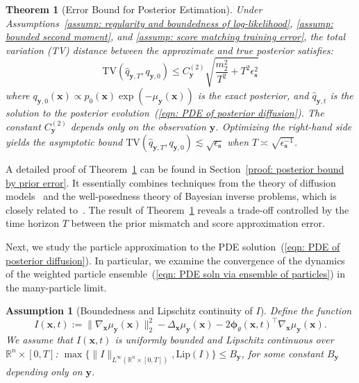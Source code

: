 \documentclass{article}
\numberwithin{equation}{section}
\newtheorem{theorem}{Theorem}[section]
\newtheorem{assumption}{Assumption}[section]
\def\eqref#1{(\ref{#1})}
\def\vs{{\bm{s}}}
\def\vx{{\bm{x}}}
\def\vy{{\bm{y}}}
\def\vphi{{\bm{\phi}}}
\newcommand{\TV}{\mathrm{TV}}
\begin{document}
\begin{tcolorbox}[colback=lightgray,boxrule=0pt,sharp corners]
\begin{theorem}[Error Bound for Posterior Estimation]
\label{thm: bound on true and approx posterior}
Under Assumptions~\ref{assump: regularity and boundedness of log-likelihood}, \ref{assump: bounded second moment}, and \ref{assump: score matching training error}, the total variation (TV) distance between the approximate and true posterior satisfies:
$$
    \TV(\widehat{q}_{\vy,T},q_{\vy,0}) \leq C^{(2)}_{\vy}\sqrt{\frac{m_2^2}{T^2} + T^2\epsilon_{\vs}^2}
$$
where $q_{\vy,0}(\vx) \propto p_0(\vx)\exp(-\mu_{\vy}(\vx))$ is the exact posterior, and $\widehat{q}_{\vy,t}$ is the solution to the posterior evolution~\eqref{eqn: PDE of posterior diffusion}. The constant $C^{(2)}_{\vy}$ depends only on the observation $\vy$. Optimizing the right-hand side yields the asymptotic bound $\TV(\widehat{q}_{\vy,T},q_{\vy,0}) \lesssim \sqrt{\epsilon_\vs}$ when $T \asymp \sqrt{\epsilon_\vs^{-1}}$.
\end{theorem}
\end{tcolorbox}

A detailed proof of Theorem~\ref{thm: bound on true and approx posterior} can be found in Section~\ref{proof: posterior bound by prior error}. It essentially combines techniques from the theory of diffusion models~\cite{chen2023improved,wang2024evaluating} and the well-posedness theory of Bayesian inverse problems, which is closely related to~\cite[Theorem 4.1]{purohit2024posterior}. The result of Theorem~\ref{thm: bound on true and approx posterior} reveals a trade-off controlled by the time horizon $T$ between the prior mismatch and score approximation error.

Next, we study the particle approximation to the PDE solution~\eqref{eqn: PDE of posterior diffusion}. In particular, we examine the convergence of the dynamics of the weighted particle ensemble~\eqref{eqn: PDE soln via ensemble of particles} in the many-particle limit.

\begin{assumption}[Boundedness and Lipschitz continuity of $I$]
\label{assump: boundedness and Lipschitz of I}
Define the function
$$
    I(\vx,t):=\|\nabla_{\vx}\mu_{\vy}(\vx)\|_2^2 - \Delta_{\vx}\mu_{\vy}(\vx)-2\vphi_{\theta}(\vx,t)^\intercal\nabla_{\vx}\mu_{\vy}(\vx).
$$
We assume that $I(\vx,t)$ is uniformly bounded and Lipschitz continuous over $\mathbb{R}^n \times [0,T]$:
$\max\{\|I\|_{L^{\infty}(\mathbb{R}^n \times [0,T])},\mathrm{Lip}(I)\} \leq B_{\vy}$,
for some constant $B_{\vy}$ depending only on $\vy$.
\end{assumption}
\end{document}
